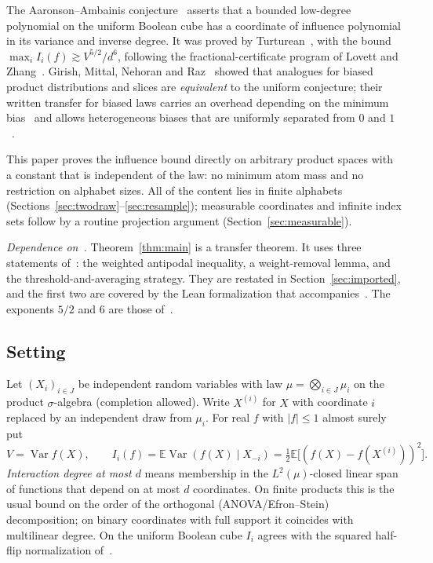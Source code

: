 \documentclass[11pt]{article}
\numberwithin{equation}{section}
\newcommand{\E}{\mathbb{E}}
\newcommand{\V}{\operatorname{Var}}
\theoremstyle{plain}
\theoremstyle{remark}
\begin{document}
The Aaronson--Ambainis conjecture~\cite{AA14} asserts that a bounded low-degree polynomial on the uniform Boolean cube has a coordinate of influence polynomial in its variance and inverse degree. It was proved by Turturean~\cite{Tur26}, with the bound $\max_iI_i(f)\gtrsim V^{5/2}/d^6$, following the fractional-certificate program of Lovett and Zhang~\cite{LZ23}. Girish, Mittal, Nehoran and Raz~\cite{GMNR26} showed that analogues for biased product distributions and slices are \emph{equivalent} to the uniform conjecture; their written transfer for biased laws carries an overhead depending on the minimum bias~\cite[Remark~4.4]{GMNR26} and allows heterogeneous biases that are uniformly separated from $0$ and $1$~\cite[Remark~4.5]{GMNR26}.

This paper proves the influence bound directly on arbitrary product spaces with a constant that is independent of the law: no minimum atom mass and no restriction on alphabet sizes. All of the content lies in finite alphabets (Sections~\ref{sec:twodraw}--\ref{sec:resample}); measurable coordinates and infinite index sets follow by a routine projection argument (Section~\ref{sec:measurable}).

\emph{Dependence on~\cite{Tur26}.} Theorem~\ref{thm:main} is a transfer theorem. It uses three statements of~\cite{Tur26}: the weighted antipodal inequality, a weight-removal lemma, and the threshold-and-averaging strategy. They are restated in Section~\ref{sec:imported}, and the first two are covered by the Lean formalization that accompanies~\cite{Tur26}. The exponents $5/2$ and $6$ are those of~\cite{Tur26}.

\subsection{Setting}\label{sec:setting}
Let $(X_i)_{i\in J}$ be independent random variables with law $\mu=\bigotimes_{i\in J}\mu_i$ on the product $\sigma$-algebra (completion allowed). Write $X^{(i)}$ for $X$ with coordinate $i$ replaced by an independent draw from $\mu_i$. For real $f$ with $|f|\le 1$ almost surely put
\begin{equation}\label{eq:defs}
V=\V f(X),\qquad I_i(f)=\E\V(f(X)\mid X_{-i})=\tfrac12\E\bigl[(f(X)-f(X^{(i)}))^2\bigr].
\end{equation}
\emph{Interaction degree at most $d$} means membership in the $L^2(\mu)$-closed linear span of functions that depend on at most $d$ coordinates. On finite products this is the usual bound on the order of the orthogonal (ANOVA/Efron--Stein) decomposition; on binary coordinates with full support it coincides with multilinear degree. On the uniform Boolean cube $I_i$ agrees with the squared half-flip normalization of~\cite{Tur26}.
\end{document}
